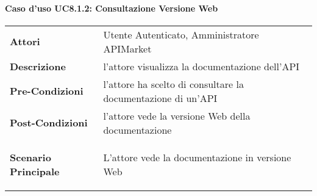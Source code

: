 \newpage
\paragraph{Caso d'uso UC8.1.2: Consultazione Versione Web}
\label{UC8.1.2}

\renewcommand*{\arraystretch}{1.6}
\begin{longtable}{ l | p{11cm}}
	\hline
	\rowcolor{Gray}
	\multicolumn{2}{c}{UC8.1.2: Consultazione Versione Web} \\
	\hline
	\textbf{Attori} &Utente Autenticato, Amministratore APIMarket \\
	\textbf{Descrizione} & l'attore visualizza la documentazione dell'API \\
	\textbf{Pre-Condizioni} &  l'attore ha scelto di consultare la documentazione di un'API\\
	\textbf{Post-Condizioni}& l'attore vede la versione Web della documentazione\\
	\textbf{Scenario Principale} & \begin{enumerate*}[label=(\arabic*.),itemjoin={\newline}]
		\item L'attore vede la documentazione in versione Web
	\end{enumerate*}\\
\end{longtable}
